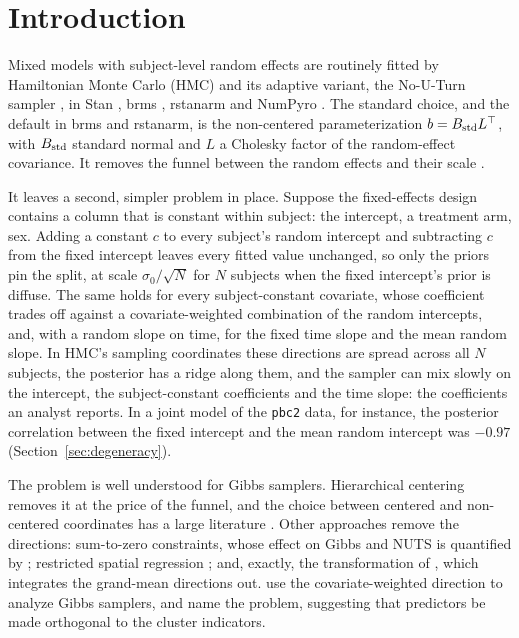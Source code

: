 \section{Introduction}\label{sec:intro}

Mixed models with subject-level random effects are routinely fitted by
Hamiltonian Monte Carlo (HMC) and its adaptive variant, the No-U-Turn
sampler \citep[NUTS;][]{hoffman2014}, in Stan \citep{carpenter2017}, brms
\citep{burkner2017}, rstanarm and NumPyro \citep{phan2019}. The standard
choice, and the default in brms and rstanarm, is the non-centered
parameterization $b = B_{\mathrm{std}} L^{\top}$, with $B_{\mathrm{std}}$ standard normal and $L$
a Cholesky factor of the random-effect covariance. It removes the funnel
between the random effects and their scale \citep{neal2003,betancourt2015}.

It leaves a second, simpler problem in place. Suppose the fixed-effects
design contains a column that is constant within subject: the intercept,
a treatment arm, sex. Adding a constant $c$ to every subject's random
intercept and subtracting $c$ from the fixed intercept leaves every fitted
value unchanged, so only the priors pin the split, at scale
$\sigma_0/\sqrt{N}$ for $N$ subjects when the fixed intercept's prior is
diffuse. The same holds for every subject-constant covariate, whose
coefficient trades off against a covariate-weighted combination of the
random intercepts, and, with a random slope on time, for the fixed time
slope and the mean random slope. In HMC's sampling coordinates these directions are spread across
all $N$ subjects, the posterior has a ridge along them, and the sampler
can mix slowly on the intercept, the subject-constant coefficients and the
time slope: the coefficients an analyst reports. In a joint model of the
\texttt{pbc2} data, for instance, the posterior correlation between the
fixed intercept and the mean random intercept was $-0.97$
(Section~\ref{sec:degeneracy}).

The problem is well understood for Gibbs samplers. Hierarchical centering
\citep{gelfand1995} removes it at the price of the funnel, and the choice
between centered and non-centered coordinates has a large literature
\citep{papaspiliopoulos2003,papaspiliopoulos2007,yu2011}. Other approaches
remove the directions: sum-to-zero constraints, whose effect on Gibbs and
NUTS is quantified by \citet{zanella2021}; restricted spatial regression
\citep{reich2006,hodges2010}; and, exactly, the transformation of
\citet{vines1996}, which integrates the grand-mean directions out.
\citet{yang2021} use the covariate-weighted direction to analyze Gibbs
samplers, and \citet{browne2009} name the problem, suggesting that
predictors be made orthogonal to the cluster indicators.

